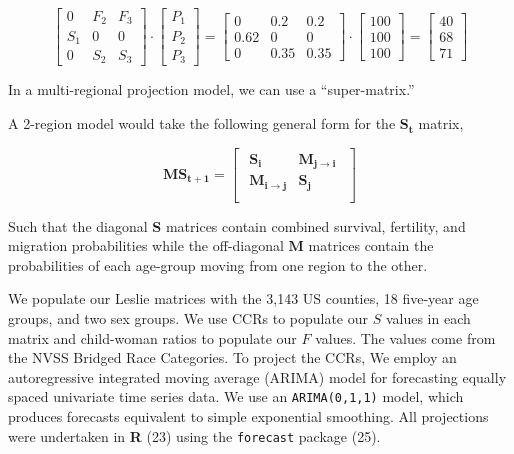 \documentclass[9pt,twocolumn,twoside,]{pnas-new}
\begin{document}
\begin{equation}
\begin{bmatrix}
    0 & F_2 & F_3 \\
    S_1 & 0 & 0 \\
    0 & S_2 & S_3
\end{bmatrix}
\cdot
\begin{bmatrix}
    P_1 \\
    P_2 \\
    P_3
\end{bmatrix}
=
\begin{bmatrix}
    0 & 0.2 & 0.2 \\
    0.62 & 0 & 0 \\
    0 & 0.35 & 0.35
\end{bmatrix}
\cdot
\begin{bmatrix}
    100 \\
    100 \\
    100
\end{bmatrix}
=
\begin{bmatrix}
    40 \\
    68 \\
    71
\end{bmatrix}\nonumber
\end{equation}

In a multi-regional projection model, we can use a ``super-matrix.''

A 2-region model would take the following general form for the
\(\mathbf{S_t}\) matrix,

\begin{equation}
 \mathbf{MS_{t+1}} =
\begin{bmatrix}
\begin{array}{c|c}

\mathbf{S_i} & \mathbf{M_{j\rightarrow i}} \\
\hline
\mathbf{M_{i\rightarrow j}} & \mathbf{S_j} \\

\end{array}
\end{bmatrix}\nonumber
\end{equation}

Such that the diagonal \(\mathbf{S}\) matrices contain combined
survival, fertility, and migration probabilities while the off-diagonal
\(\mathbf{M}\) matrices contain the probabilities of each age-group
moving from one region to the other.

We populate our Leslie matrices with the 3,143 US counties, 18 five-year
age groups, and two sex groups. We use CCRs to populate our \(S\) values
in each matrix and child-woman ratios to populate our \(F\) values. The
values come from the NVSS Bridged Race Categories. To project the CCRs,
We employ an autoregressive integrated moving average (ARIMA) model for
forecasting equally spaced univariate time series data. We use an
\texttt{ARIMA(0,1,1)} model, which produces forecasts equivalent to
simple exponential smoothing. All projections were undertaken in
\textbf{R} (23) using the \texttt{forecast} package (25).
\end{document}
